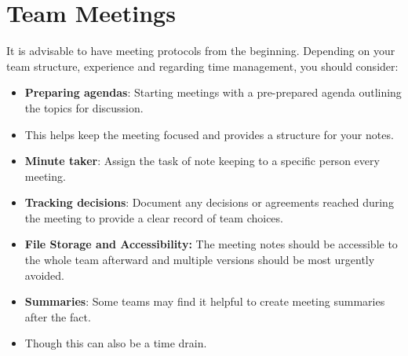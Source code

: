 

\section{Team Meetings} \label{sec:team-meetings} 
It is advisable to have meeting protocols from the beginning.
Depending on your team structure, experience and regarding time management, you should consider:
\begin{itemize}
    \item \textbf{Preparing agendas}: Starting meetings with a pre-prepared agenda outlining the topics for discussion.
    \item This helps keep the meeting focused and provides a structure for your notes.
    \item \textbf{Minute taker}: Assign the task of note keeping to a specific person every meeting.
    \item \textbf{Tracking decisions}: Document any decisions or agreements reached during the meeting to provide a clear record of team choices.
    \item \textbf{File Storage and Accessibility:} The meeting notes should be accessible to the whole team afterward and multiple versions should be most urgently avoided.
    \item \textbf{Summaries}: Some teams may find it helpful to create meeting summaries after the fact.
    \item Though this can also be a time drain.
\end{itemize}

